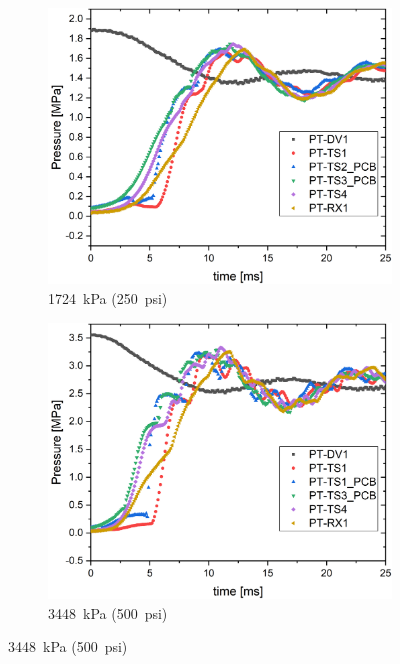 \begin{figure}[htbp]
    \vspace{16pt}
    \centering
    \begin{subfigure}{0.49\textwidth}
        \includegraphics[width=\textwidth]{results/plots/270psi_MPa_25.png}
        \caption{\SI{1724}{\kilo\pascal} (\SI{250}{psi})}
        \label{fig:piston multi 250}
    \end{subfigure}
    \hfill
    \begin{subfigure}{0.49\textwidth}
        \includegraphics[width=\textwidth]{results/plots/500psi_Mpa_25.png}
        \caption{\SI{3448}{\kilo\pascal} (\SI{500}{psi})}
        \label{fig:piston multi 500}
    \end{subfigure}
    

\end{figure}
